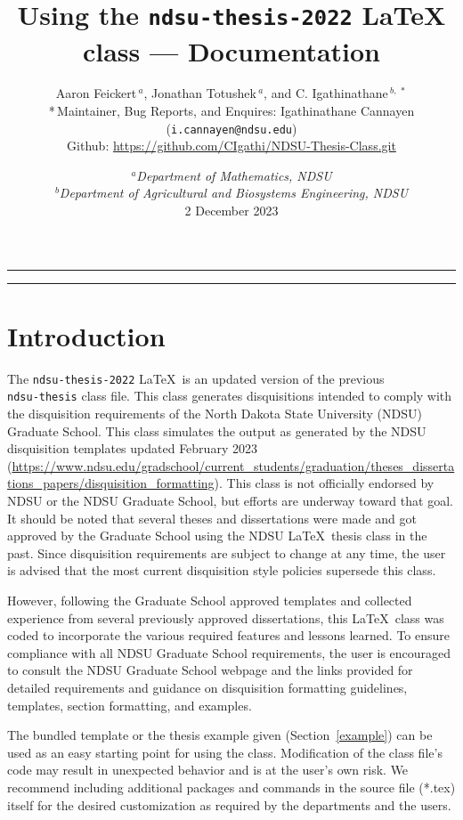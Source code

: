 \documentclass[letterpaper]{refart}
\title{Using the \texttt{ndsu-thesis-2022} \LaTeX\/ class --- Documentation}
\author{Aaron Feickert$\,^{a}$, Jonathan Totushek$\,^{a}$, and C. Igathinathane$\,^{b,\,*}$ \\ *\,Maintainer, Bug Reports, and Enquires:  Igathinathane Cannayen (\texttt{i.cannayen@ndsu.edu})\\ {\small Github: \url{https://github.com/CIgathi/NDSU-Thesis-Class.git}}
}
\date{{\small $^{a}$\emph{Department of Mathematics, NDSU} \\ $^{b}$\emph{Department of Agricultural and Biosystems Engineering, NDSU}\\[2ex]}
2 December 2023}
\newcommand\ix[1]{#1\index{#1}} %
\begin{document}
\maketitle

\hrule

\begin{fullpage}
\begin{multicols}{2}
\tableofcontents
\nopagebreak
\end{multicols}
\hrule
\end{fullpage}

\section{Introduction}
The \texttt{ndsu-thesis-2022} \LaTeX\ is an updated version of the previous \\\texttt{ndsu-thesis} \ix{class} file. This class generates disquisitions intended to comply with the disquisition requirements of the North Dakota State University (NDSU) Graduate School. This class simulates the output as generated by the NDSU disquisition templates updated February 2023 
(\url{https://www.ndsu.edu/gradschool/current_students/graduation/theses_dissertations_papers/disquisition_formatting}). This class is not officially endorsed by NDSU or the NDSU Graduate School, but efforts are underway toward that goal. It should be noted that several theses and dissertations were made and got approved by the Graduate School using the NDSU \LaTeX\ thesis class in the past. Since disquisition requirements are subject to change at any time, the user is advised that the most current disquisition style policies supersede this class. 

However, following the Graduate School approved templates and collected experience from several previously approved dissertations, this \LaTeX\ class was coded to incorporate the various required features and lessons learned. To ensure compliance with all NDSU Graduate School requirements, the user is encouraged to consult the NDSU Graduate School webpage and the links provided for detailed requirements and guidance on disquisition formatting guidelines, templates, section formatting, and examples.

The bundled \ix{template} or the thesis example given (Section~\ref{example}) can be used as an easy starting point for using the class. Modification of the class file's code may result in unexpected behavior and is at the user's own risk. We recommend including additional packages and commands in the source file (*.tex) itself for the desired customization as required by the departments and the users. 
\end{document}
